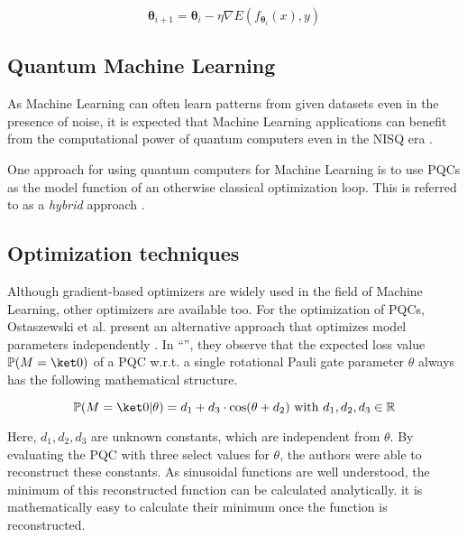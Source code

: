 \begin{equation}
    \mathbf{\theta}_{i+1} = \mathbf{\theta}_i - \eta\nabla E(f_{\mathbf{\theta}_i}(x), y)
\end{equation}


\subsection{Quantum Machine Learning}
\label{sec:real-qml-intro}

As Machine Learning can often learn patterns from given datasets even in the
presence of noise, it is expected that Machine Learning applications can benefit
from the computational power of quantum computers even in the NISQ era
\cite{ciliberto_quantum_2018,cerezo_variational_2021}.

One approach for using quantum computers for Machine Learning is to use
PQCs as the model function of an otherwise classical optimization loop.
This is referred to as a \emph{hybrid} approach
\cite{benedetti_parameterized_2019,mitarai_quantum_2018}.


\subsection{Optimization techniques}
\label{sec:optimizers}

Although gradient-based optimizers are widely used in the field of Machine
Learning, other optimizers are available too.
For the optimization of PQCs, Ostaszewski et al. present an alternative approach
that optimizes model parameters independently \cite{ostaszewski_structure_2021}.
In ``\emph{}'', they observe that
the expected loss value $\mathbb P(M = \ket 0)$ of a PQC w.r.t. a single
rotational Pauli gate parameter $\theta$ always has the following mathematical
structure.

\begin{equation}
    \mathbb{P}(M = \ket 0 | \theta) = d_1 + d_3 \cdot \cos(\theta + d_2)
    \text{ with } d_1,d_2,d_3 \in \mathbb R
\end{equation}

Here, $d_1, d_2, d_3$ are unknown constants, which are independent from
$\theta$.
By evaluating the PQC with three select values for $\theta$, the authors were
able to reconstruct these constants.
As sinusoidal functions are well understood, the minimum of this reconstructed
function can be calculated analytically. it is mathematically easy to
calculate their minimum once the function is reconstructed.
